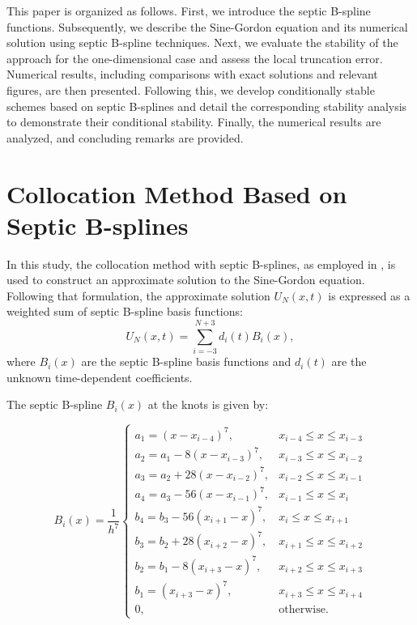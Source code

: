 \documentclass[10pt,letterpaper,twoside]{article}
\begin{document}
This paper is organized as follows. First, we introduce the septic B-spline functions. Subsequently, we describe the Sine-Gordon equation and its numerical solution using septic B-spline techniques. Next, we evaluate the stability of the approach for the one-dimensional case and assess the local truncation error. Numerical results, including comparisons with exact solutions and relevant figures, are then presented. Following this, we develop conditionally stable schemes based on septic B-splines and detail the corresponding stability analysis to demonstrate their conditional stability. Finally, the numerical results are analyzed, and concluding remarks are provided.

\section{Collocation Method Based on Septic B-splines}
In this study, the collocation method with septic B-splines, as employed in \cite{33}, is used to construct an approximate solution to the Sine-Gordon equation. Following that formulation, the approximate solution $U_{N}(x,t)$ is expressed as a weighted sum of septic B-spline basis functions:
\begin{equation}
 U_{N}(x,t)=\underset{i=-3}{\overset{N+3}{\sum }}d_{i}(t)B_{i}(x), \label{c1.2}
\end{equation} 
where $B_{i}(x)$ are the septic B-spline basis functions and $d_{i}(t)$ are the unknown time-dependent coefficients.

The septic B-spline $B_{i}(x)$ at the knots is given by:

\bigskip

\[B_i(x) = \frac{1}{h^7}
\begin{cases}
 a_1 = (x - x_{i-4})^7, & x_{i-4} \leq x \leq x_{i-3} \\[1ex]
 a_2 = a_1 - 8(x - x_{i-3})^7, & x_{i-3} \leq x \leq x_{i-2} \\[1ex]
 a_3 = a_2 + 28(x - x_{i-2})^7, & x_{i-2} \leq x \leq x_{i-1} \\[1ex]
 a_4 = a_3 - 56(x - x_{i-1})^7, & x_{i-1} \leq x \leq x_i \\[1ex]
 b_4 = b_3 - 56(x_{i+1} - x)^7, & x_i \leq x \leq x_{i+1} \\[1ex]
 b_3 = b_2 + 28(x_{i+2} - x)^7, & x_{i+1} \leq x \leq x_{i+2} \\[1ex]
 b_2 = b_1 - 8(x_{i+3} - x)^7, & x_{i+2} \leq x \leq x_{i+3} \\[1ex]
 b_1 = (x_{i+3} - x)^7, & x_{i+3} \leq x \leq x_{i+4} \\[1ex]
 0, & \text{otherwise.}
\end{cases}\]
\\[2ex]
\end{document}
